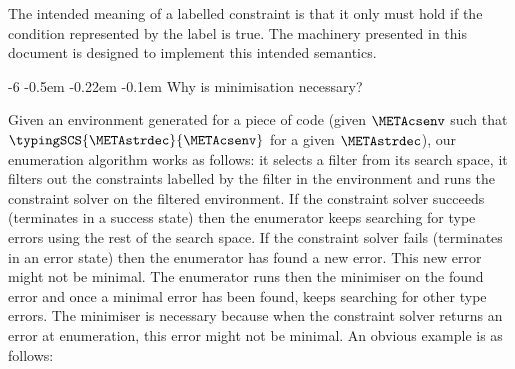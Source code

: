 \documentclass{jfp1}
\makeatletter
\def\subsubsection{\@startsection{subsubsection}{3}{\z@}{-0.2\baselineskip plus -0.1\baselineskip minus -0.1\baselineskip}%
    {-0.5em \@plus -0.22em \@minus -0.1em}{\normalfont\normalsize\bfseries}}%
\newcommand{\sectiontitledot}[1]{#1.}
\renewcommand\subsubsection{\@startsection{subsubsection}{3}{\z@}%
                            {-6\p@ \@plus -1\p@ \@minus -1\p@}%
                            {-0.5em \@plus -0.22em \@minus -0.1em}%
                            {\normalfont\normalsize\bfseries\boldmath\sectiontitledot}}
\makeatother
\begin{document}
The intended meaning of a labelled constraint is that it only must
hold if the condition represented by the label is true.  The machinery
presented in this document is designed to implement this intended semantics.
%




\subsubsection{Why is minimisation necessary?}
\label{sec:whyminimisation}



%
Given an environment generated for a piece of code (given $\METAcsenv$
such that $\typingSCS{\METAstrdec}{\METAcsenv}$ for a given
$\METAstrdec$), our enumeration algorithm works as follows: it selects
a filter from its search space, it filters out the constraints
labelled by the filter in the environment and runs the constraint
solver on the filtered environment.  If the constraint solver succeeds
(terminates in a success state) then the enumerator keeps searching
for type errors using the rest of the search space.  If the constraint
solver fails (terminates in an error state) then the enumerator has
found a new error.  This new error might not be minimal.  The
enumerator runs then the minimiser on the found error and once a
minimal error has been found, keeps searching for other type errors.
The minimiser is necessary because when the constraint solver returns
an error at enumeration, this error might not be minimal.  An obvious
example is as follows:
\end{document}
